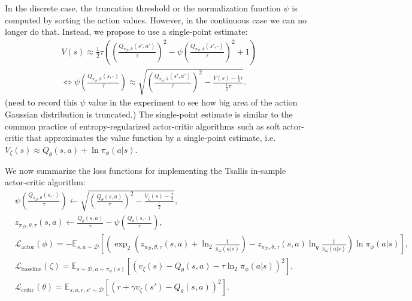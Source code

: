 \documentclass{article}
\newcommand{\AdaBracket}[1]{\left(#1\right)}
\newcommand{\AdaRectBracket}[1]{\left[#1\right]}
\newcommand{\expectation}[2]{\mathbb{E}_{#1}\AdaRectBracket{#2}}
\newcommand{\logq}[1]{\ln_{q}\!#1}
\newcommand{\datasetPolicy}{\pi_{\mathcal{D}}}
\begin{document}
In the discrete case, the truncation threshold or the normalization function $\psi$ is computed by sorting the action values.
However, in the continuous case we can no longer do that.
Instead, we propose to use a single-point estimate:
\begin{align*}
    &V(s) \approx \frac{1}{2}\tau \AdaBracket{ \AdaBracket{\frac{Q_{\datasetPolicy, k}(s',a')}{\tau}}^2 - \psi \AdaBracket{\frac{Q_{\datasetPolicy, k}(s', \cdot)}{\tau}}^2 + 1} \\
    &\Leftrightarrow \psi\AdaBracket{\frac{Q_{\datasetPolicy, k}(s,\cdot)}{\tau}} \approx \sqrt{\AdaBracket{\frac{Q_{\datasetPolicy, k}(s',a')}{\tau}}^2 - \frac{V(s) - \frac{1}{2}\tau}{\frac{1}{2}\tau}}.
\end{align*}
{\color{red}(need to record this $\psi$ value in the experiment to see how big area of the action Gaussian distribution is truncated.)}
The single-point estimate is similar to the common practice of entropy-regularized actor-critic algorithms such as soft actor-critic \cite{haarnoja-SAC2018} that approximates the value function by a single-point estimate, i.e. $V_{\zeta}(s) \approx Q_{\theta}(s,a) + \ln\pi_{\phi}(a|s)$.

We now summarize the loss functions for implementing the Tsallis in-sample actor-critic algorithm:
\begin{align}
    & \psi\AdaBracket{\frac{Q_{\datasetPolicy, \theta}(s,\cdot)}{\tau}} \leftarrow \sqrt{\AdaBracket{\frac{Q_{\theta}(s,a)}{\tau}}^2 - \frac{V_{\zeta}(s) - \frac{\tau}{2}}{\frac{\tau}{2}} }, \\ 
    & z_{\datasetPolicy, \theta, \tau}(s,a) \leftarrow \frac{Q_{\theta}(s,a)}{\tau} - \psi\AdaBracket{\frac{Q_{\theta}(s,\cdot)}{\tau}},\\
    &\mathcal{L}_\text{actor}(\phi) = -\expectation{s,a \sim \mathcal{D}}{ \AdaBracket{ \exp_2\AdaBracket{z_{\datasetPolicy, \theta, \tau}(s,a) + \ln_2\frac{1}{\pi_{\omega}(a|s)}} -  z_{\datasetPolicy, \theta, \tau}(s,a)  \logq{\frac{1}{\pi_{\omega}(a|s)}} } \ln\pi_{\phi}(a|s) }, \\
    & \mathcal{L}_\text{baseline}(\zeta) = \expectation{s\sim\mathcal{D}, a\sim \pi_{\phi}(s)}{\AdaBracket{ v_{\zeta}(s) - Q_{\theta}(s,a) - \tau\ln_2\pi_{\phi}(a|s)}^2},\\
    & \mathcal{L}_\text{critic}(\theta) = \expectation{s,a,r,s' \sim \mathcal{D}}{\AdaBracket{r + \gamma v_{\zeta}(s') - Q_{\theta}(s,a)}^2 }.
\end{align}


\clearpage



\end{document}
